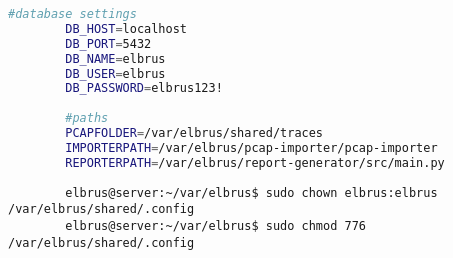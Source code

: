 	\lstset{style=files}
	\begin{lstlisting}[caption={Anhand von '.config.example' eigene '.config' Datei in \newline'/var/elbrus/shared' anlegen.}, language=bash]
		#database settings
		DB_HOST=localhost
		DB_PORT=5432
		DB_NAME=elbrus
		DB_USER=elbrus
		DB_PASSWORD=elbrus123!
		
		#paths
		PCAPFOLDER=/var/elbrus/shared/traces
		IMPORTERPATH=/var/elbrus/pcap-importer/pcap-importer
		REPORTERPATH=/var/elbrus/report-generator/src/main.py
	\end{lstlisting}
	
	\lstset{style=commands}
	\begin{lstlisting}
		elbrus@server:~/var/elbrus$ sudo chown elbrus:elbrus /var/elbrus/shared/.config
		elbrus@server:~/var/elbrus$ sudo chmod 776 /var/elbrus/shared/.config
	\end{lstlisting}